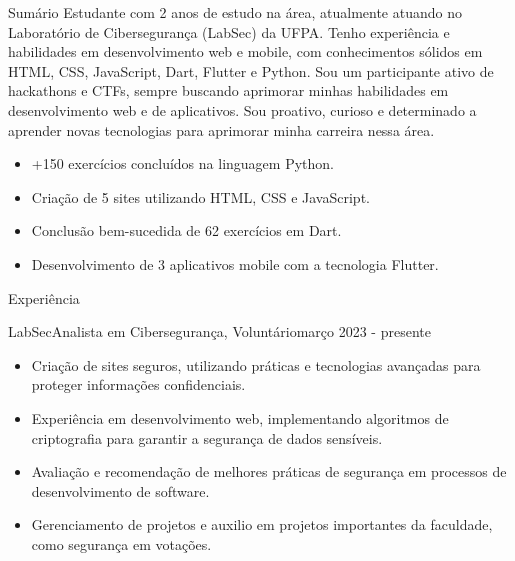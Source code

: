 \documentclass[]{mcdowellcv}
\begin{document}
\makeheader

\begin{cvsection}{Sumário}
    \vspace{\baselineskip}
    Estudante com 2 anos de estudo na área, atualmente atuando no Laboratório de Cibersegurança (LabSec) da UFPA. Tenho experiência e habilidades em desenvolvimento web e mobile, com conhecimentos sólidos em HTML, CSS, JavaScript, Dart, Flutter e Python. Sou um participante ativo de hackathons e CTFs, sempre buscando aprimorar minhas habilidades em desenvolvimento web e de aplicativos. Sou proativo, curioso e determinado a aprender novas tecnologias para aprimorar minha carreira nessa área.
     \vspace{\baselineskip}
    \begin{itemize}
        \item +150 exercícios concluídos na linguagem Python.
        \item Criação de 5 sites utilizando HTML, CSS e JavaScript.
        \item Conclusão bem-sucedida de 62 exercícios em Dart.
        \item Desenvolvimento de 3 aplicativos mobile com a tecnologia Flutter.
    \end{itemize}
\end{cvsection}


\begin{cvsection}{Experiência}
	\begin{cvsubsection}{LabSec}{Analista em Cibersegurança, Voluntário}{março 2023 - presente}
		\begin{itemize}
                \vspace{\baselineskip}
                \item Criação de sites seguros, utilizando práticas e tecnologias avançadas para proteger informações confidenciais.
			\item Experiência em desenvolvimento web, implementando algoritmos de criptografia para garantir a segurança de dados sensíveis.
			\item Avaliação e recomendação de melhores práticas de segurança em processos de desenvolvimento de software.
			\item Gerenciamento de projetos e auxilio em projetos importantes da faculdade, como segurança em votações.
		\end{itemize}
	\end{cvsubsection}
\end{cvsection}
\end{document}
